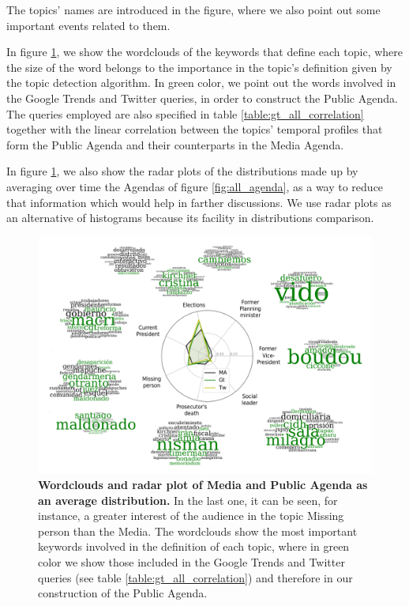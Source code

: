 The topics' names are introduced in the figure, where we also point out some important events related to them.
\par In figure \ref{fig:topics_wordclouds}, we show the wordclouds of the keywords that define each topic, where the size of the word belongs to the importance in the topic's definition given by the topic detection algorithm. In green color, we point out the words involved in the Google Trends and Twitter queries, in order to construct the Public Agenda. The queries employed are also specified in table \ref{table:gt_all_correlation} together with the linear correlation between the topics' temporal profiles that form the Public Agenda and their counterparts in the Media Agenda.
\par In figure \ref{fig:topics_wordclouds}, we also show the radar plots of the distributions made up by averaging over time the Agendas of figure \ref{fig:all_agenda}, as a way to reduce that information which would help in farther discussions. We use radar plots as an alternative of histograms because its facility in distributions comparison.  

\begin{figure}[h]
\centering
\includegraphics[width = \textwidth]{images/Fig2.pdf}
\caption{\textbf{Wordclouds and radar plot of Media and Public Agenda as an average distribution.}
In the last one, it can be seen, for instance, a greater interest of the audience in the topic Missing person than the Media. 
The wordclouds show the most important keywords involved in the definition of each topic, where in green color we show those included in the Google Trends and Twitter queries (see table \ref{table:gt_all_correlation}) and therefore in our construction of the Public Agenda.
}
\label{fig:topics_wordclouds}
\end{figure}

